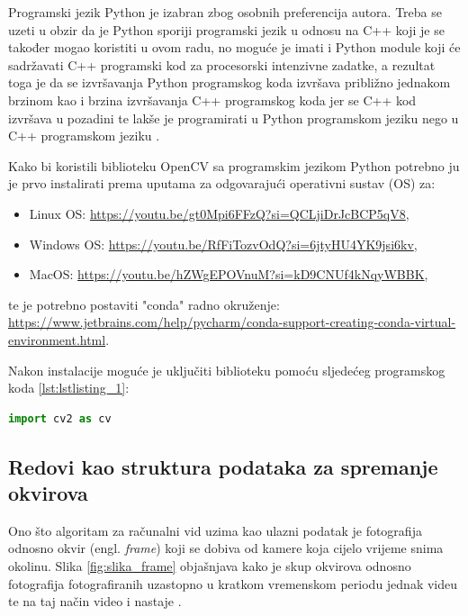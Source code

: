 \documentclass{foi}
\begin{document}
Programski jezik Python je izabran zbog osobnih preferencija autora. Treba se uzeti u obzir da je Python sporiji programski jezik u odnosu na C++ koji je se također mogao koristiti u ovom radu, no moguće je imati i Python module koji će sadržavati C++ programski kod za procesorski intenzivne zadatke, a rezultat toga je da se izvršavanja Python programskog koda izvršava približno jednakom brzinom kao i brzina izvršavanja C++ programskog koda jer se C++ kod izvršava u pozadini te lakše je programirati u Python programskom jeziku nego u C++ programskom jeziku \cite{opencv-python}.

\flushleft Kako bi koristili biblioteku OpenCV sa programskim jezikom Python potrebno ju je prvo instalirati prema uputama za odgovarajući operativni sustav (OS) za:
\begin{itemize}[noitemsep]
    \item Linux OS: \url{https://youtu.be/gt0Mpi6FFzQ?si=QCLjiDrJcBCP5qV8},
    \item Windows OS: \url{https://youtu.be/RfFiTozvOdQ?si=6jtyHU4YK9jsi6kv},
    \item MacOS: \url{https://youtu.be/hZWgEPOVnuM?si=kD9CNUf4kNqyWBBK},
\end{itemize}
te je potrebno postaviti "conda" radno okruženje: \url{https://www.jetbrains.com/help/pycharm/conda-support-creating-conda-virtual-environment.html}.

Nakon instalacije moguće je uključiti biblioteku pomoću sljedećeg programskog koda \ref{lst:lstlisting_1}:
\begin{lstlisting}[language=Python, label={lst:lstlisting_1}, firstnumber=1, style=colored, caption=Uključivanje biblioteke OpenCV za korištenje]
import cv2 as cv
\end{lstlisting}

\justifying

\subsection{Redovi kao struktura podataka za spremanje okvirova}

Ono što algoritam za računalni vid uzima kao ulazni podatak je fotografija odnosno okvir (engl. \emph{frame}) koji se dobiva od kamere koja cijelo vrijeme snima okolinu. Slika \ref{fig:slika_frame} objašnjava kako je skup okvirova odnosno fotografija fotografiranih uzastopno u kratkom vremenskom periodu jednak videu te na taj način video i nastaje \cite{AnimoticaBlog2020}.
\end{document}
